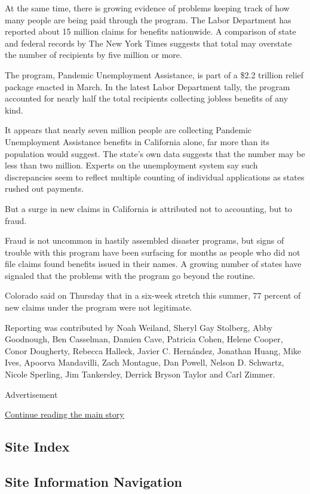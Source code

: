 At the same time, there is growing evidence of problems keeping track of
how many people are being paid through the program. The Labor Department
has reported about 15 million claims for benefits nationwide. A
comparison of state and federal records by The New York Times suggests
that total may overstate the number of recipients by five million or
more.

The program, Pandemic Unemployment Assistance, is part of a \$2.2
trillion relief package enacted in March. In the latest Labor Department
tally, the program accounted for nearly half the total recipients
collecting jobless benefits of any kind.

It appears that nearly seven million people are collecting Pandemic
Unemployment Assistance benefits in California alone, far more than its
population would suggest. The state's own data suggests that the number
may be less than two million. Experts on the unemployment system say
such discrepancies seem to reflect multiple counting of individual
applications as states rushed out payments.

But a surge in new claims in California is attributed not to accounting,
but to fraud.

Fraud is not uncommon in hastily assembled disaster programs, but signs
of trouble with this program have been surfacing for months as people
who did not file claims found benefits issued in their names. A growing
number of states have signaled that the problems with the program go
beyond the routine.

Colorado said on Thursday that in a six-week stretch this summer, 77
percent of new claims under the program were not legitimate.

Reporting was contributed by Noah Weiland, Sheryl Gay Stolberg, Abby
Goodnough, Ben Casselman, Damien Cave, Patricia Cohen, Helene Cooper,
Conor Dougherty, Rebecca Halleck, Javier C. Hernández, Jonathan Huang,
Mike Ives, Apoorva Mandavilli, Zach Montague, Dan Powell, Nelson D.
Schwartz, Nicole Sperling, Jim Tankersley, Derrick Bryson Taylor and
Carl Zimmer.

Advertisement

\protect\hyperlink{after-bottom}{Continue reading the main story}

\hypertarget{site-index}{%
\subsection{Site Index}\label{site-index}}

\hypertarget{site-information-navigation}{%
\subsection{Site Information
Navigation}\label{site-information-navigation}}

